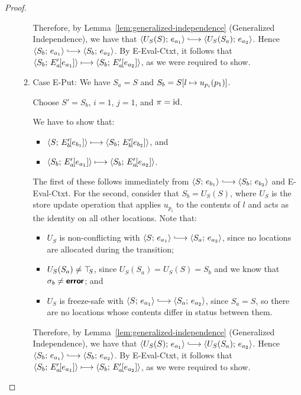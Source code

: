 \begin{proof}
\begin{enumerate}
\begin{enumerate}
      Therefore, by Lemma~\ref{lem:generalized-independence}
      (Generalized Independence), we have that
      $\config{U_S(S)}{e_{a_1}} \parstepsto
      \config{U_S(S_a)}{e_{a_2}}$.  Hence $\config{S_b}{e_{a_1}}
      \parstepsto \config{S_b}{e_{a_2}}$.  By {\sc E-Eval-Ctxt}, it
      follows that $\langle S_b;\, E'_a\hspace{-1mm}\left[e_{a_1}\right] \rangle \longmapsto
      \langle S_b;\, E'_a\hspace{-1mm}\left[e_{a_2}\right] \rangle$, as we were required to
      show.

    \item \label{slqc-beta-put}Case {\sc E-Put}: We have $S_a = S$ and
      $S_b = S[l \mapsto u_{p_i}(p_1)]$.

      Choose $S' = S_b$, $i = 1$, $j = 1$, and $\pi = \mathrm{id}$.

      We have to show that:
      \begin{itemize}
      \item $\langle S;\, E'_b\hspace{-1mm}\left[e_{b_1}\right] \rangle \longmapsto
        \langle S_b;\, E'_b\hspace{-1mm}\left[e_{b_2}\right] \rangle$, and
      \item
        $\langle S_b;\, E'_a\hspace{-1mm}\left[e_{a_1}\right] \rangle \longmapsto
        \langle S_b;\, E'_a\hspace{-1mm}\left[e_{a_2}\right] \rangle$.
      \end{itemize}

      The first of these follows immediately from $\config{S}{e_{b_1}}
      \parstepsto \config{S_b}{e_{b_2}}$ and {\sc E-Eval-Ctxt}.  For
      the second, consider that $S_b = U_S(S)$, where $U_S$ is the
      store update operation that applies $u_{p_i}$ to the contents of
      $l$ and acts as the identity on all other locations.  Note that:
      \begin{itemize}
      \item $U_S$ is non-conflicting with $\config{S}{e_{a_1}}
        \parstepsto \config{S_a}{e_{a_2}}$, since no locations are
        allocated during the transition;
        \item $U_S(S_a) \neq \top\hspace{-0.85mm}_{S}$, since $U_S(S_a) = U_S(S) = S_b$
          and we know that $\sigma_b \neq \textbf{\textsf{error}}$; and
        \item $U_S$ is freeze-safe with $\config{S}{e_{a_1}}
          \parstepsto \config{S_a}{e_{a_2}}$, since $S_a = S$, so
          there are no locations whose contents differ in status
          between them.
      \end{itemize}

      Therefore, by Lemma~\ref{lem:generalized-independence}
      (Generalized Independence), we have that
      $\config{U_S(S)}{e_{a_1}} \parstepsto
      \config{U_S(S_a)}{e_{a_2}}$.  Hence $\config{S_b}{e_{a_1}}
      \parstepsto \config{S_b}{e_{a_2}}$.  By {\sc E-Eval-Ctxt}, it
      follows that $\langle S_b;\, E'_a\hspace{-1mm}\left[e_{a_1}\right] \rangle \longmapsto
      \langle S_b;\, E'_a\hspace{-1mm}\left[e_{a_2}\right] \rangle$, as we were required to
      show.


\end{enumerate}
\end{enumerate}
\end{proof}
